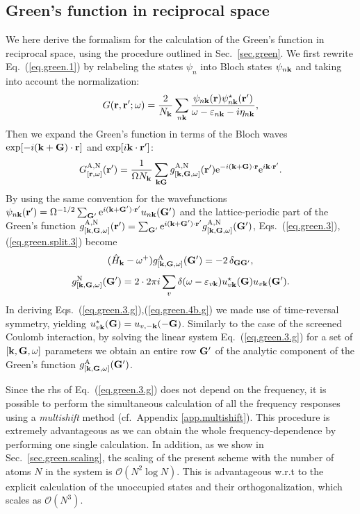\documentclass[twocolumn,prb,showpacs,superscriptaddress]{revtex4}
\def\w{\omega}
\def\H{\hat{H}}
\def\E{\varepsilon}
\def\k{{\bf k}}
\def\G{{\bf G}}
\def\Gp{{\bf G^\prime}}
\def\r{{\bf r}}
\def\rp{{\bf r^\prime}}
\begin{document}
\subsection{Green's function in reciprocal space}\label{sec.green.g}

We here derive the formalism for the calculation of the Green's function
in reciprocal space, using the procedure outlined in Sec.\ \ref{sec.green}.
We first rewrite Eq.\ (\ref{eq.green.1}) by relabeling the states
$\psi_n$ into Bloch states $\psi_{n\k}$ and taking into account the
normalization:
  \begin{equation}\label{eq.green.1.g}
  G(\r,\rp;\w) = \frac{2}{N_\k}\sum_{n\k} \frac{\psi_{n\k}(\r)\psi_{n\k}^\star(\rp)}{\w-\E_{n\k}-i\eta_{n\k}},
  \end{equation}
Then we expand the Green's function in terms
of the Bloch waves ${\rm exp}[-i(\k+\G)\cdot\r]$ and ${\rm exp}[i\k\cdot\rp]$:
  \begin{equation}\label{eq.green.bloch}
  G^{\rm A,N}_{[\r,\w]} (\rp) = \frac{1}{\Omega N_\k}  \sum_{\k\G} g^{\rm A,N}_{[\k,\G,\w]}(\rp)
   {\rm e}^{-i(\k+\G)\cdot\r} {\rm e}^{i\k\cdot\rp}.
  \end{equation}
By using the same convention for the wavefunctions 
$\psi_{n\k}(\rp)=\Omega^{-1/2}\sum_\Gp {\rm e}^{i(\k+\Gp)\cdot\rp} u_{n\k}(\Gp)$
and the lattice-periodic part of the Green's function 
$g^{\rm A,N}_{[\k,\G,\w]}(\rp)  = \sum_\Gp {\rm e}^{i(\k+\Gp)\cdot\rp} g^{\rm A,N}_{[\k,\G,\w]}(\Gp)$,
Eqs.~(\ref{eq.green.3}),(\ref{eq.green.split.3}) become
  \begin{equation}\label{eq.green.3.g}
   (\H_\k-\w^+)  g^{\rm A}_{[\k,\G,\w]}(\Gp)  =  -2 \,\delta_{\G\Gp},
  \end{equation}
  \begin{equation} \label{eq.green.4b.g}
  g^{\rm N}_{[\k,\G,\w]}(\Gp)  =  
  2 \cdot 2\pi i \sum_v \delta(\w-\E_{v\k}) u^\star_{v\k}(\G)u_{v\k} (\Gp).
  \end{equation}
In deriving Eqs.\ (\ref{eq.green.3.g}),(\ref{eq.green.4b.g}) we made use of time-reversal symmetry, yielding
$u^\star_{v\k}(\G) = u_{v,-\k}(-\G)$.
Similarly to the case of the screened Coulomb interaction, by solving the
linear system Eq.\ (\ref{eq.green.3.g}) for a set of $[\k,\G,\w]$ parameters
we obtain an entire row $\Gp$ of the analytic component of the
Green's function $g^{\rm A}_{[\k,\G,\w]}(\Gp)$.

Since the rhs of Eq.\ (\ref{eq.green.3.g}) does not depend on the frequency, 
it is possible to perform the simultaneous calculation of all the frequency responses 
using a {\it multishift} method (cf.\ Appendix \ref{app.multishift}). This procedure is extremely
advantageous as we can obtain the whole frequency-dependence by performing one
single calculation. In addition, as we show in Sec.\ \ref{sec.green.scaling},
the scaling of the present scheme with the number of atoms $N$ in the system 
is ${\mathcal O}(N^2\log N)$. This is advantageous w.r.t to the explicit calculation 
of the unoccupied states and their orthogonalization, which scales as ${\mathcal O}(N^3)$.
\end{document}
